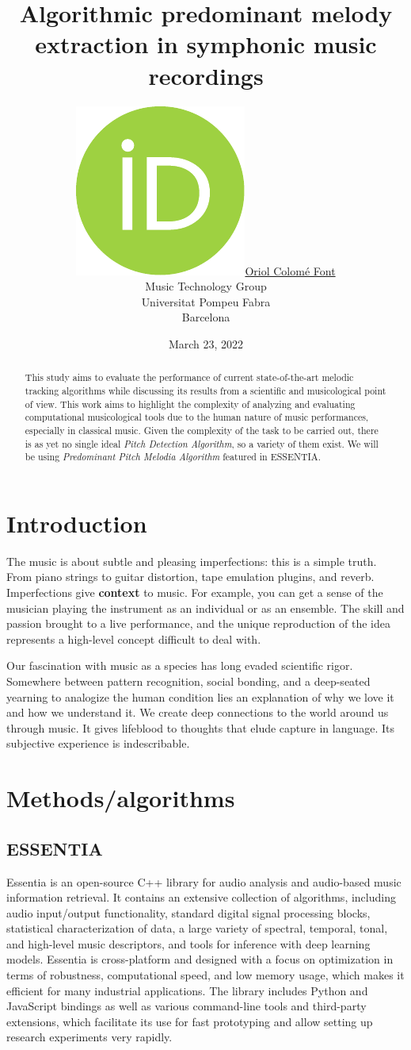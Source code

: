 \documentclass{article}
\title{Algorithmic predominant melody extraction in symphonic music recordings}
\date{March 23, 2022}
\author{\href{https://oriolcolomefont.com}{\includegraphics[scale=0.06]{orcid.pdf}\hspace{1mm}Oriol Colomé Font}\\
	Music Technology Group\\
	Universitat Pompeu Fabra\\
	Barcelona \\
}
\begin{document}
\maketitle
\begin{abstract}
This study aims to evaluate the performance of current state-of-the-art melodic tracking algorithms while discussing its results from a scientific and musicological point of view. This work aims to highlight the complexity of analyzing and evaluating computational musicological tools due to the human nature of music performances, especially in classical music. Given the complexity of the task to be carried out, there is as yet no single ideal \textit{Pitch Detection Algorithm}, so a variety of them exist. We will be using \textit{Predominant Pitch Melodia Algorithm} featured in ESSENTIA.
\end{abstract}

\section{Introduction}
The music is about subtle and pleasing imperfections: this is a simple truth. From piano strings to guitar distortion, tape emulation plugins, and reverb. Imperfections give \textbf{context} to music. For example, you can get a sense of the musician playing the instrument as an individual or as an ensemble. The skill and passion brought to a live performance, and the unique reproduction of the idea represents a high-level concept difficult to deal with.

Our fascination with music as a species has long evaded scientific rigor. Somewhere between pattern recognition, social bonding, and a deep-seated yearning to analogize the human condition lies an explanation of why we love it and how we understand it. We create deep connections to the world around us through music. It gives lifeblood to thoughts that elude capture in language. Its subjective experience is indescribable.

\section{Methods/algorithms}
\subsection{ESSENTIA}
Essentia is an open-source C++ library for audio analysis and audio-based music information retrieval. It contains an extensive collection of algorithms, including audio input/output functionality, standard digital signal processing blocks, statistical characterization of data, a large variety of spectral, temporal, tonal, and high-level music descriptors, and tools for inference with deep learning models. Essentia is cross-platform and designed with a focus on optimization in terms of robustness, computational speed, and low memory usage, which makes it efficient for many industrial applications. The library includes Python and JavaScript bindings as well as various command-line tools and third-party extensions, which facilitate its use for fast prototyping and allow setting up research experiments very rapidly.
\end{document}
